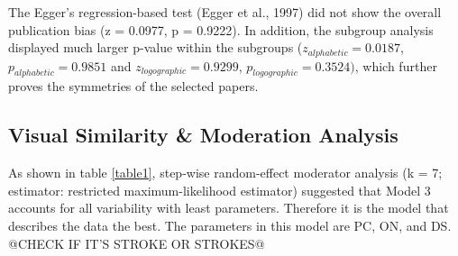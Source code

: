 \documentclass{article}
\begin{document}
The Egger’s regression-based test (Egger et al., 1997) did not show the overall publication bias (z =  0.0977, p = 0.9222). In addition, the subgroup analysis displayed much larger p-value within the subgroups (\begin{math}z_{alphabetic} = 0.0187\end{math}, \begin{math}p_{alphabetic} = 0.9851\end{math} and  \begin{math}z_{logographic} = 0.9299\end{math}, \begin{math}p_{logographic} =0.3524)\end{math}, which further proves the symmetries of the selected papers.

\subsection{Visual Similarity \& Moderation Analysis}

As shown in table \ref{table1}, step-wise random-effect moderator analysis (k = 7; estimator: restricted maximum-likelihood estimator) suggested that Model 3 accounts for all variability with least parameters. Therefore it is the model that describes the data the best. The parameters in this model are PC, ON, and DS. @CHECK IF IT'S STROKE OR STROKES@
\end{document}
